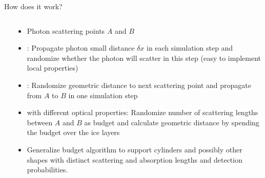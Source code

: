 
\begin{frame}[fragile]{How does it work?}

  \begin{columns}
    \begin{column}{0.5\textwidth}
      \begin{overlayarea}{\textwidth}{\textheight}
        \vspace*{2cm}
      \end{overlayarea}
    \end{column}
    \begin{column}{0.5\textwidth}
      \vspace*{-8mm}
      \begin{itemize}
        \item Photon scattering points $A$ and $B$
        \item<1> : Propagate photon small distance $\delta x$ in each simulation step and randomize whether the photon will scatter in this step (easy to implement local properties)
        \item<2> : Randomize geometric distance to next scattering point and propagate from $A$ to $B$ in one simulation step
        \item<3>  with different optical properties: Randomize number of scattering lengths between $A$ and $B$ as budget and calculate geometric distance by spending the budget over the ice layers
        \item<4>  Generalize budget algorithm to support cylinders and possibly other shapes with distinct scattering and absorption lengths and detection probabilities.
      \end{itemize}

    \end{column}
  \end{columns}

\end{frame}